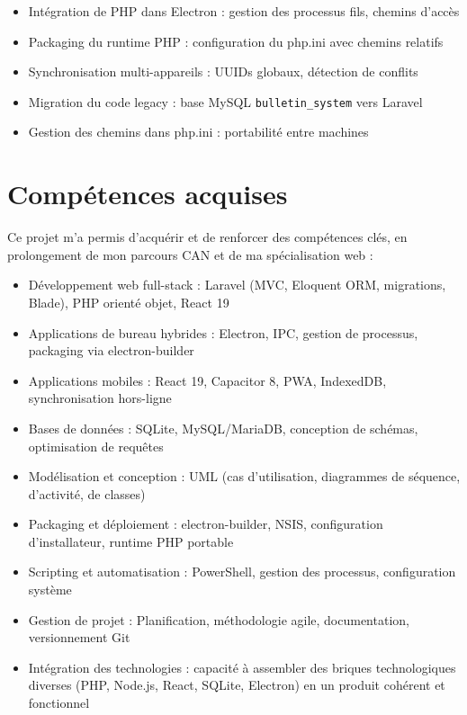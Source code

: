\documentclass[12pt,a4paper,twoside]{report}
\begin{document}
\begin{itemize}
    \item Intégration de PHP dans Electron : gestion des processus fils, chemins d'accès
    \item Packaging du runtime PHP : configuration du php.ini avec chemins relatifs
    \item Synchronisation multi-appareils : UUIDs globaux, détection de conflits
    \item Migration du code legacy : base MySQL \texttt{bulletin\_system} vers Laravel
    \item Gestion des chemins dans php.ini : portabilité entre machines
\end{itemize}

\section*{Compétences acquises}

Ce projet m'a permis d'acquérir et de renforcer des compétences clés, en prolongement de mon parcours CAN et de ma spécialisation web :

\begin{itemize}
    \item Développement web full-stack : Laravel (MVC, Eloquent ORM, migrations, Blade), PHP orienté objet, React 19
    \item Applications de bureau hybrides : Electron, IPC, gestion de processus, packaging via electron-builder
    \item Applications mobiles : React 19, Capacitor 8, PWA, IndexedDB, synchronisation hors-ligne
    \item Bases de données : SQLite, MySQL/MariaDB, conception de schémas, optimisation de requêtes
    \item Modélisation et conception : UML (cas d'utilisation, diagrammes de séquence, d'activité, de classes)
    \item Packaging et déploiement : electron-builder, NSIS, configuration d'installateur, runtime PHP portable
    \item Scripting et automatisation : PowerShell, gestion des processus, configuration système
    \item Gestion de projet : Planification, méthodologie agile, documentation, versionnement Git
    \item Intégration des technologies : capacité à assembler des briques technologiques diverses (PHP, Node.js, React, SQLite, Electron) en un produit cohérent et fonctionnel
\end{itemize}
\end{document}
